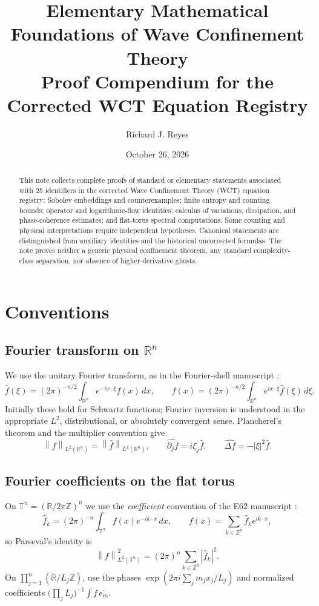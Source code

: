 \documentclass[11pt,letterpaper]{article}
\title{\textbf{Elementary Mathematical Foundations of Wave Confinement Theory}\\[.45em]
\large Proof Compendium for the Corrected WCT Equation Registry}
\author{Richard J. Reyes}
\date{October 26, 2026}
\theoremstyle{definition}
\theoremstyle{remark}
\newcommand{\R}{\mathbb R}
\newcommand{\Z}{\mathbb Z}
\newcommand{\T}{\mathbb T}
\newcommand{\norm}[1]{\left\lVert#1\right\rVert}
\newcommand{\abs}[1]{\left\lvert#1\right\rvert}
\begin{document}
\maketitle
\begin{abstract}
This note collects complete proofs of standard or elementary statements associated with
25 identifiers in the corrected Wave Confinement Theory (WCT) equation registry:
Sobolev embeddings and counterexamples; finite entropy and counting bounds;
operator and logarithmic-flow identities; calculus of variations, dissipation,
and phase-coherence estimates; and flat-torus spectral computations.
Some counting and physical interpretations require independent hypotheses.
Canonical statements are distinguished from auxiliary identities and the historical
uncorrected formulas. The note proves neither a generic physical confinement theorem,
any standard complexity-class separation, nor absence of higher-derivative ghosts.
\end{abstract}
\tableofcontents
\newpage

\section{Conventions}
\subsection{Fourier transform on $\R^n$}
We use the unitary Fourier transform, as in the Fourier-shell manuscript
\cite{reyesMath}:
\begin{equation}\label{eq:fourier}
\widehat f(\xi)=(2\pi)^{-n/2}\int_{\R^n}e^{-ix\cdot\xi}f(x)\,dx,
\qquad
f(x)=(2\pi)^{-n/2}\int_{\R^n}e^{ix\cdot\xi}\widehat f(\xi)\,d\xi.
\end{equation}
Initially these hold for Schwartz functions; Fourier inversion is understood
in the appropriate $L^2$, distributional, or absolutely convergent sense.
Plancherel's theorem and the multiplier convention give
\begin{equation}
\norm f_{L^2(\R^n)}=\norm{\widehat f}_{L^2(\R^n)},\qquad
\widehat{\partial_j f}=i\xi_j\widehat f,\qquad
\widehat{\Delta f}=-\abs\xi^2\widehat f.
\end{equation}
\subsection{Fourier coefficients on the flat torus}
On $\T^n=(\R/2\pi\Z)^n$ we use the \emph{coefficient} convention of the
E62 manuscript \cite{reyesMath}:
\begin{equation}\label{eq:torusfourier}
\widehat f_k=(2\pi)^{-n}\int_{\T^n}f(x)e^{-ik\cdot x}\,dx,
\qquad f(x)=\sum_{k\in\Z^n}\widehat f_ke^{ik\cdot x},
\end{equation}
so Parseval's identity is
\begin{equation}
\norm f_{L^2(\T^n)}^2=(2\pi)^n\sum_{k\in\Z^n}\abs{\widehat f_k}^2.
\end{equation}
On $\prod_{j=1}^n(\R/L_j\Z)$, use the phases
$\exp(2\pi i\sum_jm_jx_j/L_j)$ and normalized coefficients
$\bigl(\prod_jL_j\bigr)^{-1}\int f\,\overline{e_m}$.
\end{document}
